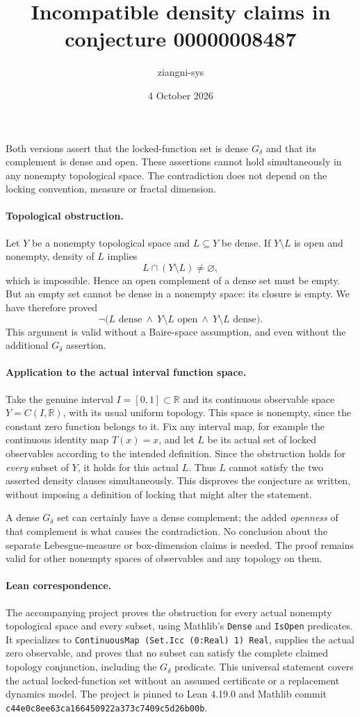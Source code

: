 \documentclass[11pt]{article}
\title{Incompatible density claims in conjecture 00000008487}
\author{ziangni-sys}
\date{4 October 2026}
\begin{document}
\maketitle
Both versions assert that the locked-function set is dense $G_\delta$
and that its complement is dense and open. These assertions cannot
hold simultaneously in any nonempty topological space. The contradiction
does not depend on the locking convention, measure or fractal dimension.

\paragraph{Topological obstruction.}
Let $Y$ be a nonempty topological space and $L\subseteq Y$ be dense.
If $Y\setminus L$ is open and nonempty, density of $L$ implies
\[
L\cap(Y\setminus L)\ne\varnothing,
\]
which is impossible. Hence an open complement of a dense set must be
empty. But an empty set cannot be dense in a nonempty space: its closure
is empty. We have therefore proved
\[
\neg\bigl(L\text{ dense}\ \land\ Y\setminus L\text{ open}
\ \land\ Y\setminus L\text{ dense}\bigr).
\]
This argument is valid without a Baire-space assumption, and even
without the additional $G_\delta$ assertion.

\paragraph{Application to the actual interval function space.}
Take the genuine interval $I=[0,1]\subset\mathbb R$ and its continuous
observable space $Y=C(I,\mathbb R)$, with its usual uniform topology.
This space is nonempty, since the constant zero function belongs to it.
Fix any interval map, for example the continuous identity map
$T(x)=x$, and let $L$ be its actual set of locked observables according
to the intended definition. Since the obstruction holds for \emph{every}
subset of $Y$, it holds for this actual $L$. Thus $L$ cannot satisfy the
two asserted density clauses simultaneously. This disproves the
conjecture as written, without imposing a definition of locking that
might alter the statement.

A dense $G_\delta$ set can certainly have a dense complement; the added
\emph{openness} of that complement is what causes the contradiction.
No conclusion about the separate Lebesgue-measure or box-dimension
claims is needed. The proof remains valid for other nonempty spaces
of observables and any topology on them.

\paragraph{Lean correspondence.}
The accompanying project proves the obstruction for every actual
nonempty topological space and every subset, using Mathlib's
\texttt{Dense} and \texttt{IsOpen} predicates. It specializes to
\texttt{ContinuousMap (Set.Icc (0:Real) 1) Real}, supplies the actual
zero observable, and proves that no subset can satisfy the complete
claimed topology conjunction, including the $G_\delta$ predicate. This universal
statement covers the actual locked-function set without an assumed
certificate or a replacement dynamics model. The project is pinned
to Lean 4.19.0 and Mathlib commit
\texttt{c44e0c8ee63ca166450922a373c7409c5d26b00b}.
\end{document}
